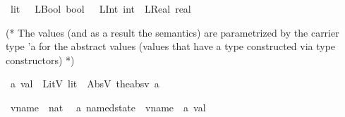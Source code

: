 \begin{isabellebody}\isanewline
\isamarkupfalse%
\ lit\ {\isacharequal}{\kern0pt}\ \ LBool\ bool\ \ {\isacharbar}{\kern0pt}\ LInt\ int\ {\isacharbar}{\kern0pt}\ LReal\ real

\begin{isamarkuptext}%
(* The values (and as a result the semantics) are parametrized by the carrier type 'a for the 
abstract values (values that have a type constructed via type constructors) *) %
\end{isamarkuptext}\isamarkuptrue%
\isamarkupfalse%
\ {\isacharprime}{\kern0pt}a{\kern0pt}\ val\ {\isacharequal}{\kern0pt}\ LitV\ lit\ {\isacharbar}{\kern0pt}\ AbsV\ {\isacharparenleft}{\kern0pt}the{\isacharunderscore}{\kern0pt}absv{\isacharcolon}{\kern0pt}\ {\isacharprime}{\kern0pt}a{\isacharparenright}{\kern0pt}\isanewline



\isamarkupfalse%
\ vname\ {\isacharequal}{\kern0pt}\ nat\ \isanewline
\isamarkupfalse%
\ {\isacharprime}{\kern0pt}a{\kern0pt}\ named{\isacharunderscore}{\kern0pt}state\ {\isacharequal}{\kern0pt}\ {\isachardoublequoteopen}vname\ {\isasymrightharpoonup}\ {\isacharprime}{\kern0pt}a{\kern0pt}\ val{\isachardoublequoteclose}\isanewline


\end{isabellebody}
